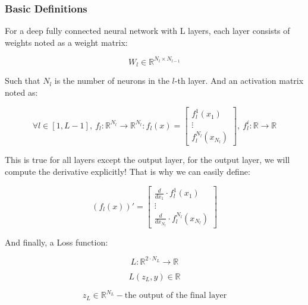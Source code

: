 \subsubsection{Basic Definitions}

For a deep fully connected neural network with L layers, each layer consists of weights noted as a weight matrix:

\begin{equation} \label{eq:weight_l}
    W_l \in \mathbb{R}^{N_l \times N_{l-1}}
\end{equation}

Such that \( N_l \) is the number of neurons in the \(l\)-th layer.
And an activation matrix noted as:

\begin{equation} \label{eq:activation_def}
    \forall l \in [1, L-1], \ f_l: \mathbb{R}^{N_l} \to \mathbb{R}^{N_l} \colon f_l (x) = \begin{bmatrix} f_l^1(x_1) \\ \vdots \\ f_l^{N_l}(x_{N_l}) \end{bmatrix}, \ f_l^i : \mathbb{R} \to \mathbb{R}
\end{equation}

This is true for all layers except the output layer, for the output layer, we will compute the derivative explicitly!
That is why we can easily define:

\begin{equation} \label{eq:col_der}
    (f_l (x))' = \begin{bmatrix} \frac{d}{dx_1} \cdot f_l^1(x_1) \\ \vdots \\ \frac{d}{dx_{N_l}} \cdot f_l^{N_l}(x_{N_l}) \end{bmatrix}
\end{equation}

And finally, a Loss function:

\begin{equation}
    L: \mathbb{R}^{2 \cdot N_L} \to \mathbb{R}
\end{equation}

\begin{equation}
    L(z_L, y) \in \mathbb{R}
\end{equation}

\begin{equation}
    z_L \in \mathbb{R}^{N_L} - \text{the output of the final layer}
\end{equation}

